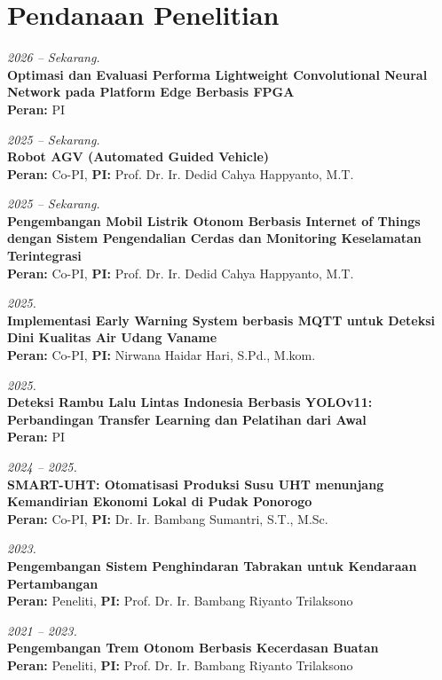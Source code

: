 \section{Pendanaan Penelitian}

\vspace{6pt}
\textit{2026 -- Sekarang.} \\
\textbf{Optimasi dan Evaluasi Performa Lightweight Convolutional Neural Network pada Platform Edge Berbasis FPGA} \\
\textbf{Peran:} PI

\vspace{6pt}
\textit{2025 -- Sekarang.} \\
\textbf{Robot AGV (Automated Guided Vehicle)} \\
\textbf{Peran:} Co-PI, \quad \textbf{PI:} Prof. Dr. Ir. Dedid Cahya Happyanto, M.T.

\vspace{6pt}
\textit{2025 -- Sekarang.} \\
\textbf{Pengembangan Mobil Listrik Otonom Berbasis Internet of Things dengan Sistem Pengendalian Cerdas dan Monitoring Keselamatan Terintegrasi} \\
\textbf{Peran:} Co-PI, \quad \textbf{PI:} Prof. Dr. Ir. Dedid Cahya Happyanto, M.T.

\vspace{6pt}
\textit{2025.} \\
\textbf{Implementasi Early Warning System berbasis MQTT untuk Deteksi Dini Kualitas Air Udang Vaname} \\
\textbf{Peran:} Co-PI, \quad \textbf{PI:} Nirwana Haidar Hari, S.Pd., M.kom.

\vspace{6pt}
\textit{2025.} \\
\textbf{Deteksi Rambu Lalu Lintas Indonesia Berbasis YOLOv11: Perbandingan Transfer Learning dan Pelatihan dari Awal} \\
\textbf{Peran:} PI

\vspace{6pt}
\textit{2024 -- 2025.} \\
\textbf{SMART-UHT: Otomatisasi Produksi Susu UHT menunjang Kemandirian Ekonomi Lokal di Pudak Ponorogo} \\
\textbf{Peran:} Co-PI, \quad \textbf{PI:} Dr. Ir. Bambang Sumantri, S.T., M.Sc.

\vspace{6pt}
\textit{2023.} \\
\textbf{Pengembangan Sistem Penghindaran Tabrakan untuk Kendaraan Pertambangan} \\
\textbf{Peran:} Peneliti, \quad \textbf{PI:} Prof. Dr. Ir. Bambang Riyanto Trilaksono

\vspace{6pt}
\textit{2021 -- 2023.} \\
\textbf{Pengembangan Trem Otonom Berbasis Kecerdasan Buatan} \\
\textbf{Peran:} Peneliti, \quad \textbf{PI:} Prof. Dr. Ir. Bambang Riyanto Trilaksono

